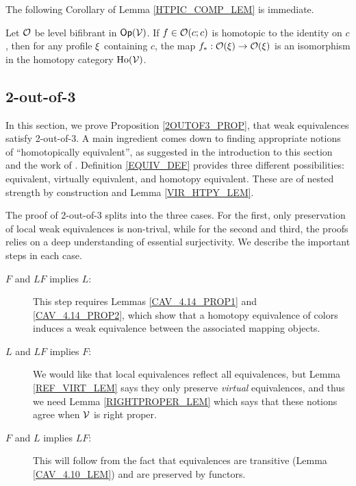 \documentclass[a4paper,10pt
,draft
]{article}%
\renewcommand{\1}{\eta}%
\begin{document}
The following Corollary of Lemma \ref{HTPIC_COMP_LEM} is immediate.
\begin{corollary}[{cf. \cite[Lemma 1.23]{GM17}}]
      \label{HTPIC_ISO_COR}
      Let $\mathcal{O}$ be level bifibrant in $\mathsf{Op}(\mathcal V)$. 
      If $f \in \mathcal{O}(c;c)$ is homotopic to the identity on $c$, then for any profile $\xi$ containing $c$, the map
      $f_{\**}: \O(\ksi) \to \O(\ksi)$
     is an isomorphism in the homotopy category $\operatorname{Ho}(\mathcal V)$.
\end{corollary}







\subsection{2-out-of-3}

In this section, we prove Proposition \ref{2OUTOF3_PROP}, that weak equivalences satisfy 2-out-of-3.
A main ingredient comes down to finding appropriate notions of ``homotopically equivalent'', as suggested in the introduction to this section and the work of \cite{Cav, BM13}.
Definition \ref{EQUIV_DEF} provides three different possibilities: equivalent, virtually equivalent, and homotopy equivalent.
These are of nested strength by construction and Lemma \ref{VIR_HTPY_LEM}.

The proof of 2-out-of-3 splits into the three cases. For the first, only preservation of local weak equivalences is non-trival, while for the second and third, the proofs relies on a deep understanding of essential surjectivity.
We describe the important steps in each case.
\begin{description}
\item [$F$ and $LF$ implies $L$:] This step requires Lemmas \ref{CAV_4.14_PROP1} and \ref{CAV_4.14_PROP2}, which show that a homotopy equivalence of colors induces a weak equivalence between the associated mapping objects.
\item [$L$ and $LF$ implies $F$:] We would like that local equivalences reflect all equivalences, but Lemma \ref{REF_VIRT_LEM} says they only preserve \textit{virtual} equivalences, and thus we need Lemma \ref{RIGHTPROPER_LEM} which says that these notions agree when $\mathcal V$ is right proper.
\item [$F$ and $L$ implies $LF$:] This will follow from the fact that equivalences are transitive (Lemma \ref{CAV_4.10_LEM}) and are preserved by functors.
\end{description}
\end{document}
